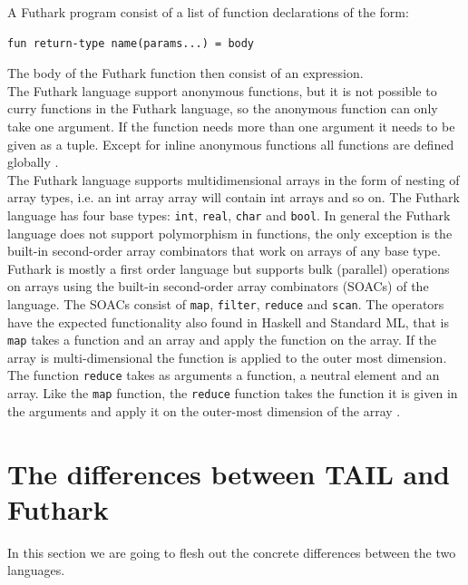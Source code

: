 \documentclass[11pt]{article}
\begin{document}
A Futhark program consist of a list of function declarations of the form:
\begin{lstlisting}[numbers=none,frame=none]
fun return-type name(params...) = body
\end{lstlisting}

The body of the Futhark function then consist of an expression.\\

The Futhark language support anonymous functions, but it is not possible to curry functions in the Futhark language,
so the anonymous function can only take one argument.
If the function needs more than one argument it needs to be given as a tuple.
Except for inline anonymous functions all functions are defined globally \cite{TroelsHenriksen}. \\

The Futhark language supports multidimensional arrays in the form of nesting of array types,
i.e. an int array array will contain int arrays and so on.
The Futhark language has four base types: {\tt int}, {\tt real}, {\tt char} and {\tt bool}.
In general the Futhark language does not support polymorphism in functions,
the only exception is the built-in second-order array combinators that work on arrays of any base type. \\

Futhark is mostly a first order language but supports bulk (parallel) operations on arrays
using the built-in second-order array combinators (SOACs) of the language. 
The SOACs consist of {\tt map}, {\tt filter}, {\tt reduce} and {\tt scan}.
The operators have the expected functionality also found in Haskell and Standard ML,
that is {\tt map} takes a function and an array and apply the function on the array.
If the array is multi-dimensional the function is applied to the outer most dimension.
The function {\tt reduce} takes as arguments a function, a neutral element and an array.
Like the {\tt map} function, the {\tt reduce} function takes the function it is given in the arguments
and apply it on the outer-most dimension of the array \cite{TroelsHenriksen}. \\ 



\section{The differences between TAIL and Futhark}
In this section we are going to flesh out the concrete differences between the two languages. 
\end{document}

